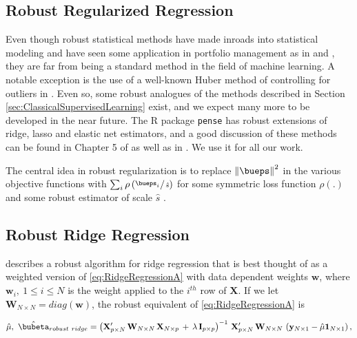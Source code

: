 \documentclass[graybox,envcountchap,sectrefs]{svmono}\usepackage[]{graphicx}\usepackage[]{xcolor}
\begin{document}
\begin{appendices}
\section{Robust Regularized Regression}

Even though robust statistical methods have made inroads into statistical
modeling and have seen some application in portfolio management as
in \citet{MartinStoyanovLiShammaa2023} and \citet{MartinGuerardXia2024},
they are far from being a standard method in the field of machine
learning. A notable exception is the use of a well-known Huber method
of controlling for outliers in \citet{GuKellyXiu2020}. Even so, some
robust analogues of the methods described in Section \ref{sec:ClassicalSupervisedLearning}
exist, and we expect many more to be developed in the near future.
The R package \texttt{pense} has robust extensions of ridge, lasso
and elastic net estimators, and a good discussion of these methods
can be found in Chapter 5 of \citet{Maronna2019} as well as in \citet{FreueKepplingerSalibianSmucler2019}.
We use it for all our work.

The central idea in robust regularization is to replace $\left\Vert \bueps\right\Vert ^{2}$
in the various objective functions with $\sum_{i}\rho\left(\nicefrac{\bueps_{i}\,}{\,\hat{s}}\right)$
for some symmetric loss function $\rho(.)$ and some robust estimator
of scale $\hat{s}$ . 

\subsection{Robust Ridge Regression}

\citet{Maronna2011} describes a robust algorithm for ridge regression
that is best thought of as a weighted version of \eqref{eq:RidgeRegressionA}
with data dependent weights $\mathbf{w}$, where $\mathbf{w}_{i},\ 1\leqslant i\leqslant N$
is the weight applied to the $i^{th}$ row of $\mathbf{X}$. If we
let $\mathbf{W}_{N\times N}=diag(\mathbf{w})$, the robust equivalent
of \eqref{eq:RidgeRegressionA} is

\begin{equation}
\hat{\mu},\ \hat{\bubeta}_{robust\ ridge}=\left(\mathrm{\mathbf{X}}_{p\times N}^{\prime}\,\mathbf{W}_{N\times N}\,\mathrm{\mathbf{X}}_{N\times p}\,+\,\lambda\,\mathbf{I}_{p\times p}\right)^{-1}\,\mathrm{\mathbf{X}}_{p\times N}^{\prime}\,\mathbf{W}_{N\times N}\,\left(\mathrm{\mathbf{y}}_{N\times1}-\hat{\mu}\boldsymbol{1}_{N\times1}\right),\label{eq:RobustRidgeRegressionSolution}
\end{equation}


\end{appendices}
\end{document}
